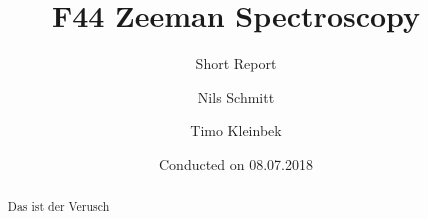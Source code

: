 \documentclass[12pt,
				 a4paper,
				 ]{scrartcl}
\title{F44 Zeeman Spectroscopy}
\subtitle{Short Report}
\author{Nils Schmitt \and Timo Kleinbek}
\date{Conducted on 08.07.2018}
\begin{document}
\maketitle
\begin{abstract}
Das ist der Verusch
\end{abstract}
\end{document}
